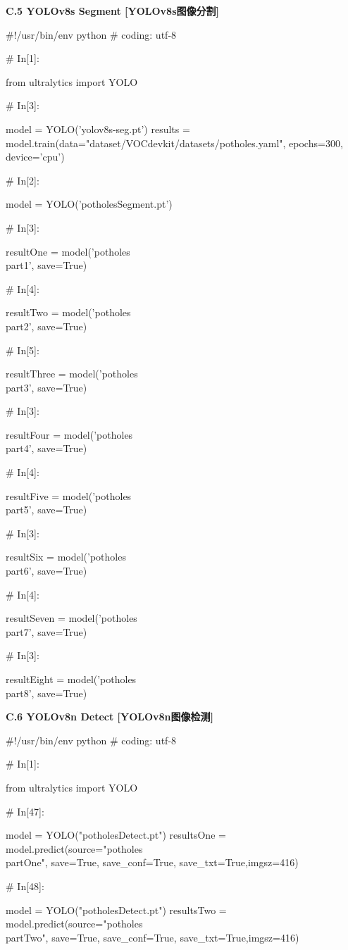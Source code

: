 \documentclass{MathorCupmodeling}
\begin{document}
\textbf{C.5 YOLOv8s Segment [YOLOv8s图像分割]}
\begin{python}
#!/usr/bin/env python
# coding: utf-8

# In[1]:


from ultralytics import YOLO

# In[3]:


model = YOLO('yolov8s-seg.pt')
results = model.train(data="dataset/VOCdevkit/datasets/potholes.yaml", epochs=300, device='cpu')

# In[2]:


model = YOLO('potholesSegment.pt')

# In[3]:


resultOne = model('potholes\\part1', save=True)

# In[4]:


resultTwo = model('potholes\\part2', save=True)

# In[5]:


resultThree = model('potholes\\part3', save=True)

# In[3]:


resultFour = model('potholes\\part4', save=True)

# In[4]:


resultFive = model('potholes\\part5', save=True)

# In[3]:


resultSix = model('potholes\\part6', save=True)

# In[4]:


resultSeven = model('potholes\\part7', save=True)

# In[3]:


resultEight = model('potholes\\part8', save=True)
\end{python}

\textbf{C.6 YOLOv8n Detect [YOLOv8n图像检测]}
\begin{python}
#!/usr/bin/env python
# coding: utf-8

# In[1]:


from ultralytics import YOLO


# In[47]:


model = YOLO("potholesDetect.pt")
resultsOne = model.predict(source="potholes\\partOne", save=True, save_conf=True, save_txt=True,imgsz=416)


# In[48]:


model = YOLO("potholesDetect.pt")
resultsTwo = model.predict(source="potholes\\partTwo", save=True, save_conf=True, save_txt=True,imgsz=416)
\end{python}
\end{document}
